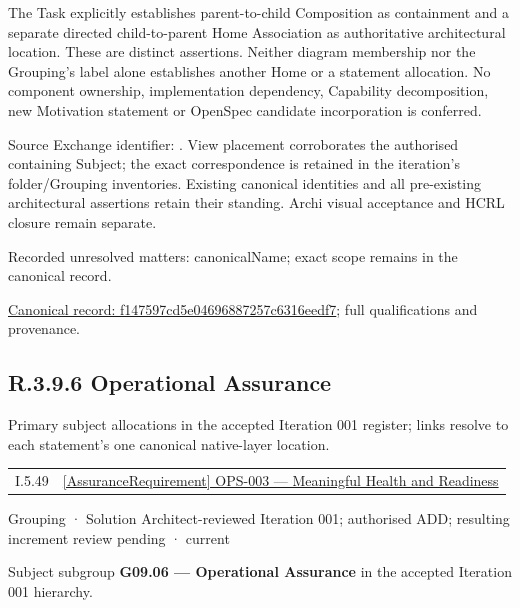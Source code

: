 The Task explicitly establishes parent-to-child Composition as containment and
a separate directed child-to-parent Home Association as authoritative architectural
location. These are distinct assertions. Neither diagram membership nor the
Grouping's label alone establishes another Home or a statement allocation.
No component ownership, implementation dependency, Capability decomposition,
new Motivation statement or OpenSpec candidate incorporation is conferred.



Source Exchange identifier: \texttt{}. View placement corroborates
the authorised containing Subject; the exact correspondence is retained in the
iteration's folder/Grouping inventories. Existing canonical identities and all
pre-existing architectural assertions retain their standing. Archi visual
acceptance and HCRL closure remain separate.


{\small Recorded unresolved matters: canonicalName; exact scope remains in the canonical record.}\par
{\footnotesize \href{../../../../continuum/grouping/f147597cd5e04696887257c6316eedf7.md}{Canonical record: f147597cd5e04696887257c6316eedf7}; full qualifications and provenance.}\par
\subsection*{R.3.9.6 Operational Assurance}
\label{navigation:R.3.9.6}

Primary subject allocations in the accepted Iteration 001 register; links resolve to each statement’s one canonical native-layer location.\par
\begin{longtable}{p{.22\linewidth}p{.73\linewidth}}
I.5.49 & \hyperref[element:4c02fec3af264b878ee3e0cfaecbf55f]{[AssuranceRequirement] OPS-003 — Meaningful Health and Readiness} \\
\end{longtable}
\label{element:315ba7bbe4624223a97a7e7e6d9cc252}
{\small Grouping · Solution Architect-reviewed Iteration 001; authorised ADD; resulting increment review pending · current}\par

Subject subgroup \textbf{G09.06 — Operational Assurance} in the accepted Iteration 001 hierarchy.



